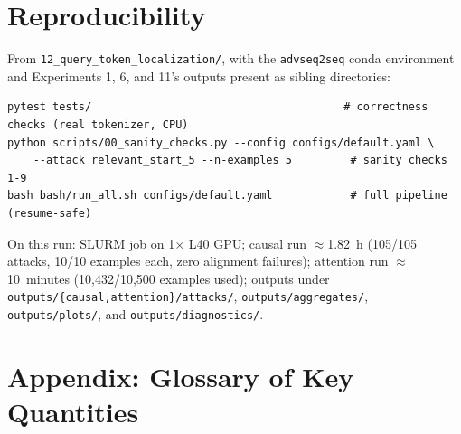 \documentclass[11pt]{article}
\begin{document}
\section{Reproducibility}

From \texttt{12\_query\_token\_localization/}, with the \texttt{advseq2seq} conda
environment and Experiments 1, 6, and 11's outputs present as sibling directories:

\begin{lstlisting}
pytest tests/                                       # correctness checks (real tokenizer, CPU)
python scripts/00_sanity_checks.py --config configs/default.yaml \
    --attack relevant_start_5 --n-examples 5         # sanity checks 1-9
bash bash/run_all.sh configs/default.yaml            # full pipeline (resume-safe)
\end{lstlisting}

\noindent On this run: SLURM job on 1$\times$ L40 GPU; causal run $\approx$1.82~h
(105/105 attacks, 10/10 examples each, zero alignment failures); attention run
$\approx$10~minutes (10{,}432/10{,}500 examples used); outputs under
\texttt{outputs/\{causal,attention\}/attacks/}, \texttt{outputs/aggregates/},
\texttt{outputs/plots/}, and \texttt{outputs/diagnostics/}.

\section*{Appendix: Glossary of Key Quantities}
\end{document}
